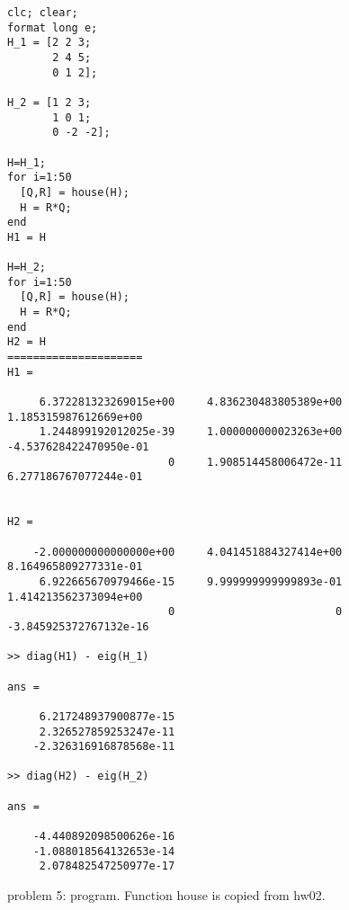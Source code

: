 \documentclass[10pt]{article}
\begin{document}
\begin{program}
 \begin{verbatim}
clc; clear;
format long e;
H_1 = [2 2 3;
       2 4 5;
       0 1 2];

H_2 = [1 2 3;
       1 0 1;
       0 -2 -2];

H=H_1;
for i=1:50
  [Q,R] = house(H);
  H = R*Q;
end
H1 = H

H=H_2;
for i=1:50
  [Q,R] = house(H);
  H = R*Q;
end
H2 = H
=====================
H1 =

     6.372281323269015e+00     4.836230483805389e+00     1.185315987612669e+00
     1.244899192012025e-39     1.000000000023263e+00    -4.537628422470950e-01
                         0     1.908514458006472e-11     6.277186767077244e-01


H2 =

    -2.000000000000000e+00     4.041451884327414e+00     8.164965809277331e-01
     6.922665670979466e-15     9.999999999999893e-01     1.414213562373094e+00
                         0                         0    -3.845925372767132e-16

>> diag(H1) - eig(H_1)

ans =

     6.217248937900877e-15
     2.326527859253247e-11
    -2.326316916878568e-11

>> diag(H2) - eig(H_2)

ans =

    -4.440892098500626e-16
    -1.088018564132653e-14
     2.078482547250977e-17
  \end{verbatim}
\caption{problem 5: program. Function house is copied from hw02.}
\end{program}
\end{document}
